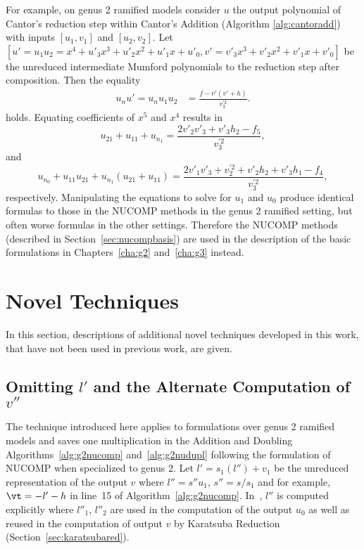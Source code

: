 For example, on genus 2 ramified models consider $u$ the output
polynomial of Cantor's reduction step within Cantor's Addition (Algorithm
\ref{alg:cantoradd}) with inputs $[u_1,v_1]$ and $[u_2,v_2]$. Let $[u' = u_1u_2
= x^4 + u'_3x^3 + u'_2x^2 + u'_1x + u'_0, v' = v'_3x^3 + v'_2x^2 + v'_1x +
v'_0]$ be the unreduced intermediate Mumford polynomials to the reduction step
after composition. Then the equality
\begin{align*} 
  u_nu' = u_nu_1u_2 &= \frac{f - v'(v' + h)}{v^{\prime 2}_3}.
\end{align*} holds. Equating coefficients of $x^5$ and $x^4$ results in 
$$u_{21} + u_{11} + u_{n_1} = \frac{2v'_2v'_3 + v'_3h_2 - f_5}{v^{\prime 2}_3},$$ and 
$$ u_{n_0} + u_{11}u_{21} + u_{n_1}(u_{21} + u_{11}) = \frac{2v'_1v'_3 +
v^{\prime 2}_2 + v'_2h_2 + v'_3h_1 - f_4}{v^{\prime 2}_3},$$ respectively.
Manipulating the equations to solve for $u_1$ and $u_0$ produce identical
formulas to those in the NUCOMP methods in the genus 2 ramified setting, but often worse
formulas in the other settings.  Therefore the NUCOMP methods (described in
Section~\ref{sec:nucompbasis}) are used in the description of the basic
formulations in Chapters~\ref{cha:g2} and~\ref{cha:g3} instead.



\section{Novel Techniques}
In this section, descriptions of additional novel techniques developed in this
work, that have not been used in previous work, are given.


\subsection{Omitting  \texorpdfstring{$l'$}{l'} and the Alternate Computation of  \texorpdfstring{$v''$}{v''}} 
\label{sec:vsave}
The technique introduced here applies to formulations over genus 2 ramified
models and saves one multiplication in the Addition and Doubling
Algorithms~\ref{alg:g2nucomp} and~\ref{alg:g2nudupl} following the formulation
of NUCOMP when specialized to genus 2. Let $l' = s_1(l'') + v_1$ be the
unreduced representation of the output $v$ where $l'' = s''u_1$, $s'' =s/s_1$ and for
example, $\vt = -l'-h$ in line~15 of Algorithm~\ref{alg:g2nucomp}.
In~\cite{Lange_explicit_2005}, $l''$ is computed explicitly where $l''_1$,
$l''_2$ are used in the computation of the output $u_0$ as well as reused in the
computation of output $v$ by Karatsuba Reduction
(Section~\ref{sec:karatsubared}). 

